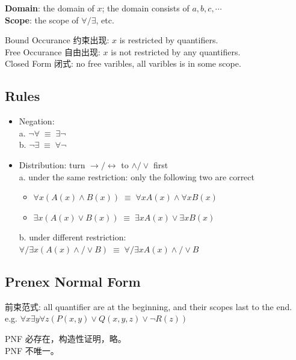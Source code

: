 \documentclass[12pt, a4paper, UTF8, openany]{ctexbook}
\newcommand{\bi}{\leftrightarrow} %
\begin{document}
        \textbf{Domain}: the domain of $x$; the domain consists of $a, b, c, \cdots$ \\
        \textbf{Scope}: the scope of $\forall/\exists$, etc.

        Bound Occurance 约束出现: $x$ is restricted by quantifiers. \\
        Free Occurance 自由出现: $x$ is not restricted by any quantifiers. \\
        Closed Form 闭式: no free varibles, all varibles is in some scope. 

        \subsection{Rules}
        \begin{itemize}
            \item Negation: \\
                a. $\lnot \forall \; \equiv \; \exists \lnot$ \\
                b. $\lnot \exists \; \equiv \; \forall \lnot$
            \item Distribution: turn $\to/\bi$ to $\land/\lor$ first \\
                a. under the same restriction: only the following two are correct
                \begin{itemize}
                    \item $\forall x(A(x) \land B(x)) \; \equiv \; \forall x A(x) \land \forall x B(x)$
                    \item $\exists x(A(x) \lor B(x)) \; \equiv \; \exists x A(x) \lor \exists x B(x)$
                \end{itemize}
                b. under different restriction: 
                    $\forall/\exists x(A(x) \land/\lor B) \; \equiv \; \forall/\exists x A(x) \land/\lor B$
        \end{itemize}

        \subsection{Prenex Normal Form}
        前束范式: all quantifier are at the beginning, and their scopes last to the end. \\
        e.g. $\forall x \exists y \forall z (P(x, y) \lor Q(x, y, z) \lor \lnot R(z))$

        PNF 必存在，构造性证明，略。\\
        PNF 不唯一。
    
\end{document}
